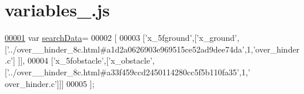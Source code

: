 \hypertarget{variables__17_8js_source}{}\section{variables\+\_.\+js}
\label{variables__17_8js_source}

\begin{DoxyCode}
\hypertarget{variables__17_8js_source.tex_l00001}{}\hyperlink{variables__17_8js_ad01a7523f103d6242ef9b0451861231e}{00001} var \hyperlink{variables__17_8js_ad01a7523f103d6242ef9b0451861231e}{searchData}=
00002 [
00003   [\textcolor{stringliteral}{'x\_5fground'},[\textcolor{stringliteral}{'x\_ground'},[\textcolor{stringliteral}{'../over\_\_hinder\_8c.html#a1d2a0626903e969515ce52ad9dee74da'},1,\textcolor{stringliteral}{'over\_hinder.c'}]
      ]],
00004   [\textcolor{stringliteral}{'x\_5fobstacle'},[\textcolor{stringliteral}{'x\_obstacle'},[\textcolor{stringliteral}{'../over\_\_hinder\_8c.html#a33f459ccd2450114280cc5f5b110fa35'},1,\textcolor{stringliteral}{'
      over\_hinder.c'}]]]
00005 ];
\end{DoxyCode}
